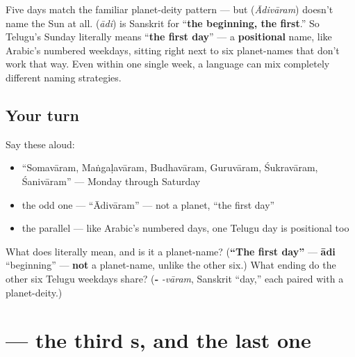 \begin{culture}
Five days match the familiar planet-deity pattern — but \textbf{} (\emph{Ādivāram}) doesn't name the Sun at all. \textbf{} (\emph{ādi}) is Sanskrit for \textquotedblleft{}\textbf{the beginning, the first}.\textquotedblright{} So Telugu's Sunday literally means \textquotedblleft{}\textbf{the first day}\textquotedblright{} — a \textbf{positional} name, like Arabic's numbered weekdays, sitting right next to six planet-names that don't work that way. Even within one single week, a language can mix completely different naming strategies.
\end{culture}

\subsection*{Your turn}
Say these aloud:

\begin{itemize}
\raggedright
  \item \textquotedblleft{}Somavāram, Maṅgaḷavāram, Budhavāram, Guruvāram, Śukravāram, Śanivāram\textquotedblright{} — Monday through Saturday
  \item the odd one — \textquotedblleft{}Ādivāram\textquotedblright{} — not a planet, \textquotedblleft{}the first day\textquotedblright{}
  \item the parallel — like Arabic's numbered days, one Telugu day is positional too
\end{itemize}

\begin{tcolorbox}[breakable,colback=teal!4,colframe=teal!35!black,title={Before you move on}]
What does \textbf{} literally mean, and is it a planet-name? (\textbf{\textquotedblleft{}The first day\textquotedblright{}} — \textbf{ādi} \textquotedblleft{}beginning\textquotedblright{} — \textbf{not} a planet-name, unlike the other six.) What ending do the other six Telugu weekdays share? (\textbf{‑} \emph{-vāram}, Sanskrit \textquotedblleft{}day,\textquotedblright{} each paired with a planet-deity.)
\end{tcolorbox}
\section[\texorpdfstring{\te{శ} (śa)}{శ (śa)}]{ — the third s, and the last one}

\label{lesson:TE-S159-letter-sha}



